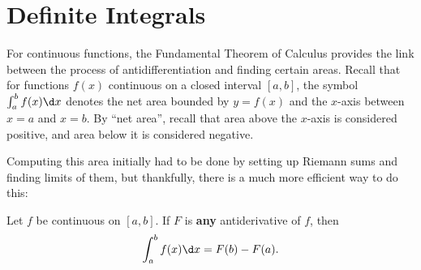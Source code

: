 \documentclass[nooutcomes]{ximera}
\begin{document}
\section{Definite Integrals}
For continuous functions, the Fundamental Theorem of Calculus provides the link between the process of antidifferentiation and finding certain areas.  Recall that for functions $f(x)$ continuous on a closed interval $[a,b]$, the symbol $\int_a^b f(x) \d x$ denotes the net area bounded by $y=f(x)$ and the $x$-axis between $x=a$ and $x=b$.  By ``net area'', recall that area above the $x$-axis is considered positive, and area below it is considered negative.  

Computing this area initially had to be done by setting up Riemann sums and finding limits of them, but thankfully, there is a much more efficient way to do this:  


\begin{theorem}
  Let $f$ be continuous on $[a,b]$. If $F$ is \textbf{any}
  antiderivative of $f$, then
  \[
  \int_a^b f(x)\d x = F(b)-F(a).
  \]
\end{theorem}
\end{document}
